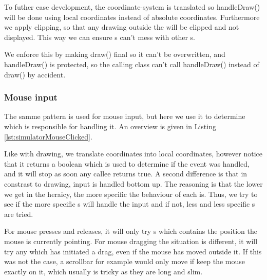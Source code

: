 

To futher ease development, the coordinate-system is translated so handleDraw() will be done using local coordinates instead of absolute coordinates. Furthermore we apply clipping, so that any drawing outside the  will be clipped and not displayed. This way we can ensure s can't mess with other s.

We enforce this by making draw() final so it can't be overwritten, and handleDraw() is protected, so the calling class can't call handleDraw() instead of draw() by accident.


\subsubsection{Mouse input}

The samme pattern is used for mouse input, but here we use it to determine which  is responsible for handling it. An overview is given in Listing \ref{lst:simulatorMouseClicked}.



Like with drawing, we translate coordinates into local coordinates, however notice that it returns a boolean which is used to determine if the event was handled, and it will stop as soon any callee returns true. A second difference is that in constrast to drawing, input is handled bottom up. The reasoning is that the lower we get in the heraicy, the more specific the behaviour of each  is. Thus, we try to see if the more specific s will handle the input and if not, less and less specific s are tried.

For mouse presses and releases, it will only try s which contains the position the mouse is currently pointing. For mouse dragging the situation is different, it will try any  which has initiated a drag, even if the mouse has moved outside it. If this was not the case, a scrollbar for example would only move if keep the mouse exactly on it, which usually is tricky as they are long and slim.


